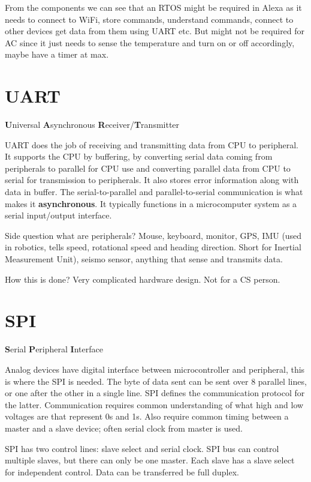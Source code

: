 \documentclass[11pt]{article}
\begin{document}
From the components we can see that an RTOS might be required in Alexa
as it needs to connect to WiFi, store commands, understand commands,
connect to other devices get data from them using UART etc. But might
not be required for AC since it just needs to sense the temperature
and turn on or off accordingly, maybe have a timer at max.

\section{UART}
\label{sec:org8902b42}
\textbf{U}niversal \textbf{A}synchronous
\textbf{R}eceiver/\textbf{T}ransmitter

UART does the job of receiving and transmitting data from CPU to
peripheral. It supports the CPU by buffering, by converting serial
data coming from peripherals to parallel for CPU use and converting
parallel data from CPU to serial for transmission to peripherals. It
also stores error information along with data in buffer. The
serial-to-parallel and parallel-to-serial communication is what makes
it \textbf{asynchronous}. It typically functions in a microcomputer system as
a serial input/output interface.

Side question what are peripherals? Mouse, keyboard, monitor, GPS, IMU
(used in robotics, tells speed, rotational speed and heading
direction. Short for Inertial Measurement Unit), seismo sensor,
anything that sense and transmits data.

How this is done? Very complicated hardware design. Not for a CS person.

\section{SPI}
\label{sec:org73e9699}
\textbf{S}erial \textbf{P}eripheral \textbf{I}nterface

Analog devices have digital interface between microcontroller and
peripheral, this is where the SPI is needed. The byte of data sent can
be sent over 8 parallel lines, or one after the other in a single
line. SPI defines the communication protocol for the
latter. Communication requires common understanding of what high and
low voltages are that represent 0s and 1s. Also require common timing
between a master and a slave device; often serial clock from master is
used.

SPI has two control lines: slave select and serial clock. SPI bus can
control multiple slaves, but there can only be one master. Each slave
has a slave select for independent control. Data can be transferred be
full duplex.
\end{document}
